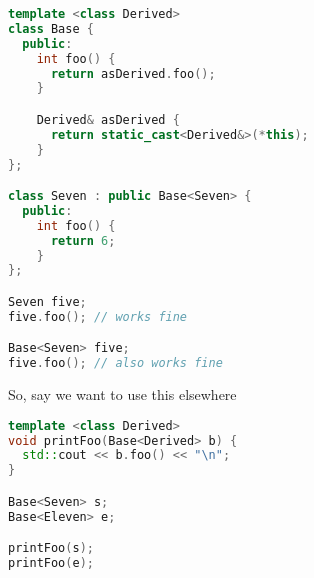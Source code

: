 \begin{lstlisting}[language=C++]
template <class Derived>
class Base {
  public:
    int foo() {
      return asDerived.foo();
    }

    Derived& asDerived {
      return static_cast<Derived&>(*this);
    }
};

class Seven : public Base<Seven> {
  public:
    int foo() {
      return 6;
    }
};

Seven five;
five.foo(); // works fine

Base<Seven> five;
five.foo(); // also works fine
\end{lstlisting}

So, say we want to use this elsewhere

\begin{lstlisting}[language=C++]
template <class Derived>
void printFoo(Base<Derived> b) {
  std::cout << b.foo() << "\n";
}

Base<Seven> s;
Base<Eleven> e;

printFoo(s);
printFoo(e);
\end{lstlisting}

